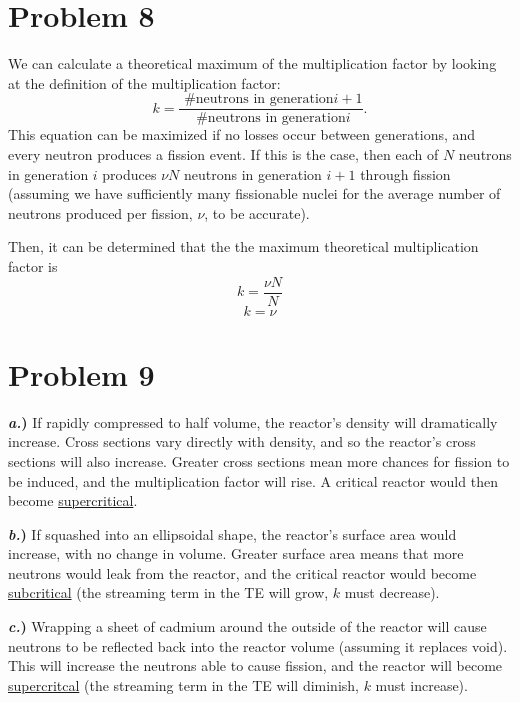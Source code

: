\documentclass{article}
\begin{document}

\section*{Problem 8}

We can calculate a theoretical maximum of the multiplication factor by looking at the definition of the multiplication factor:
$$ k = \frac{\text{ \# neutrons in generation}i+1}{\text{ \# neutrons in generation} i}. $$
This equation can be maximized if no losses occur between generations, and every neutron produces a fission event. If this is the case, then each of $N$ neutrons in generation $i$ produces $\nu N$ neutrons in generation $i+1$ through fission (assuming we have sufficiently many fissionable nuclei for the average number of neutrons produced per fission, $\nu$, to be accurate).

Then, it can be determined that the the maximum theoretical multiplication factor is 
$$ k = \frac{\nu N}{N} $$
$$\boxed{ k = \nu }$$




\section*{Problem 9}

\textbf{\textit{a.})} If rapidly compressed to half volume, the reactor's density will dramatically increase. Cross sections vary directly with density, and so the reactor's cross sections will also increase. Greater cross sections mean more chances for fission to be induced, and the multiplication factor will rise. A critical reactor would then become \underline{supercritical}.

\textbf{\textit{b.})} If squashed into an ellipsoidal shape, the reactor's surface area would increase, with no change in volume. Greater surface area means that more neutrons would leak from the reactor, and the critical reactor would become \underline{subcritical} (the streaming term in the TE will grow, $k$ must decrease).

\textbf{\textit{c.})} Wrapping a sheet of cadmium around the outside of the reactor will cause neutrons to be reflected back into the reactor volume (assuming it replaces void). This will increase the neutrons able to cause fission, and the reactor will become \underline{supercritcal}  (the streaming term in the TE will diminish, $k$ must increase).
\end{document}
